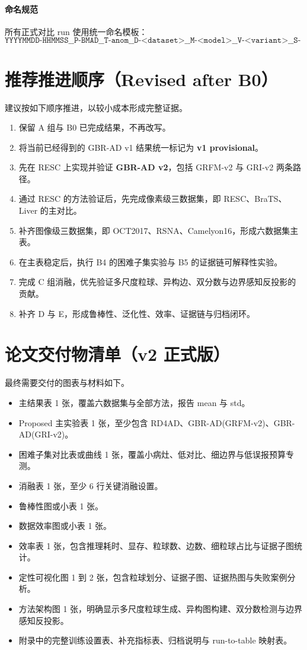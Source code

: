 \documentclass[UTF8,a4paper]{ctexart}
\newcommand{\gbrvtwo}{\textbf{GBR-AD v2}}
\begin{document}
\paragraph{命名规范}
所有正式对比 run 使用统一命名模板：
\begin{equation}
  \texttt{YYYYMMDD-HHMMSS\_\_P-BMAD\_\_T-anom\_\_D-<dataset>\_\_M-<model>\_\_V-<variant>\_\_S-<seed>\_\_H-<host>}
\end{equation}

\section{推荐推进顺序（Revised after B0）}
建议按如下顺序推进，以较小成本形成完整证据。
\begin{enumerate}
  \item 保留 A 组与 B0 已完成结果，不再改写。
  \item 将当前已经得到的 GBR-AD v1 结果统一标记为 \textbf{v1 provisional}。
  \item 先在 RESC 上实现并验证 \gbrvtwo，包括 GRFM-v2 与 GRI-v2 两条路径。
  \item 通过 RESC 的方法验证后，先完成像素级三数据集，即 RESC、BraTS、Liver 的主对比。
  \item 补齐图像级三数据集，即 OCT2017、RSNA、Camelyon16，形成六数据集主表。
  \item 在主表稳定后，执行 B4 的困难子集实验与 B5 的证据链可解释性实验。
  \item 完成 C 组消融，优先验证多尺度粒球、异构边、双分数与边界感知反投影的贡献。
  \item 补齐 D 与 E，形成鲁棒性、泛化性、效率、证据链与归档闭环。
\end{enumerate}

\section{论文交付物清单（v2 正式版）}
最终需要交付的图表与材料如下。
\begin{itemize}
  \item 主结果表 1 张，覆盖六数据集与全部方法，报告 mean 与 std。
  \item Proposed 主实验表 1 张，至少包含 RD4AD、GBR-AD(GRFM-v2)、GBR-AD(GRI-v2)。
  \item 困难子集对比表或曲线 1 张，覆盖小病灶、低对比、细边界与低误报预算专测。
  \item 消融表 1 张，至少 6 行关键消融设置。
  \item 鲁棒性图或小表 1 张。
  \item 数据效率图或小表 1 张。
  \item 效率表 1 张，包含推理耗时、显存、粒球数、边数、细粒球占比与证据子图统计。
  \item 定性可视化图 1 到 2 张，包含粒球划分、证据子图、证据热图与失败案例分析。
  \item 方法架构图 1 张，明确显示多尺度粒球生成、异构图构建、双分数检测与边界感知反投影。
  \item 附录中的完整训练设置表、补充指标表、归档说明与 run-to-table 映射表。
\end{itemize}
\end{document}
